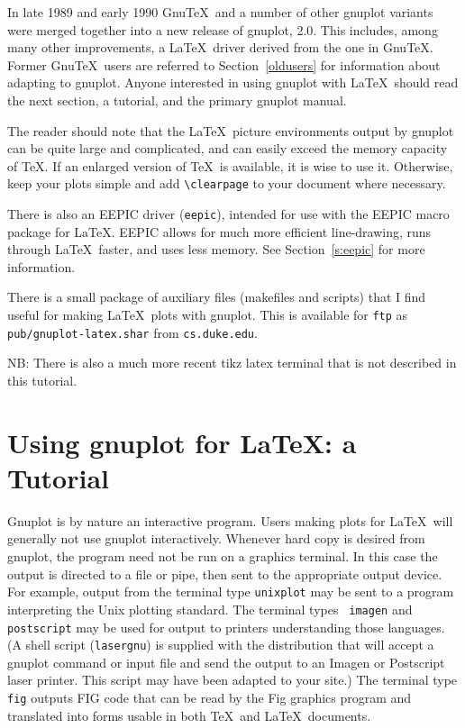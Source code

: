 In late 1989 and early 1990 Gnu\TeX\ and a number of other gnuplot
variants were merged together into a new release of gnuplot, 2.0. This
includes, among many other improvements, a \LaTeX\ driver derived from
the one in Gnu\TeX. Former Gnu\TeX\ users are referred to
Section~\ref{oldusers} for information about adapting to gnuplot.
Anyone interested in using gnuplot with \LaTeX\ should read the next
section, a tutorial, and the primary gnuplot manual.

The reader should note that the \LaTeX\ picture environments output by
gnuplot can be quite large and complicated, and can easily exceed the
memory capacity of \TeX. If an enlarged version of \TeX\ is available,
it is wise to use it. Otherwise, keep your plots simple and add
\verb+\clearpage+ to your document where necessary.

There is also an EEPIC driver ({\tt eepic}), intended for use with
the EEPIC macro package for \LaTeX. EEPIC allows for much more
efficient line-drawing, runs through \LaTeX\ faster, and uses less
memory.  See Section~\ref{s:eepic} for more information.

There is a small package of auxiliary files (makefiles and scripts)
that I find useful for making \LaTeX\ plots with gnuplot. This is
available for \verb+ftp+ as \verb+pub/gnuplot-latex.shar+ from
\verb+cs.duke.edu+.

NB: There is also a much more recent tikz latex terminal that
is not described in this tutorial.

\section{Using gnuplot for \LaTeX: a Tutorial}

Gnuplot is by nature an interactive program. Users making plots for
\LaTeX\ will generally not use gnuplot interactively.  Whenever hard
copy is desired from gnuplot, the program need not be run on a
graphics terminal. In this case the output is directed to a file or
pipe, then sent to the appropriate output device. For example, output
from the terminal type {\tt unixplot} may be sent to a program
interpreting the Unix plotting standard. The terminal types {\tt
imagen} and {\tt postscript} may be used for output to printers
understanding those languages. (A shell script ({\tt lasergnu}) is
supplied with the distribution that will accept a gnuplot command or
input file and send the output to an Imagen or Postscript laser
printer. This script may have been adapted to your site.) The terminal
type {\tt fig} outputs FIG code that can be read by the Fig graphics
program and translated into forms usable in both \TeX\ and
\LaTeX\ documents.


